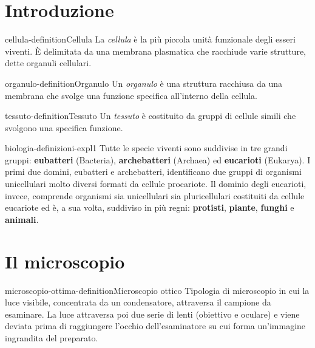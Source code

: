 \documentclass[preview]{standalone}
\begin{document}
\genpage

\section{Introduzione}

\begin{snippetdefinition}{cellula-definition}{Cellula}
    La \textit{cellula} è la più piccola unità funzionale degli esseri
    viventi. È delimitata da una membrana plasmatica
    che racchiude varie strutture, dette organuli cellulari.
\end{snippetdefinition}

\begin{snippetdefinition}{organulo-definition}{Organulo}
    Un \textit{organulo} è una struttura racchiusa da una membrana che svolge
    una funzione specifica all'interno della cellula.
\end{snippetdefinition}

\begin{snippetdefinition}{tessuto-definition}{Tessuto}
    Un \textit{tessuto} è costituito da gruppi
    di cellule simili che svolgono
    una specifica funzione.
\end{snippetdefinition}

\begin{snippet}{biologia-definizioni-expl1}
Tutte le specie viventi sono suddivise in tre grandi gruppi:
\textbf{eubatteri} (Bacteria), \textbf{archebatteri} (Archaea)
ed \textbf{eucarioti} (Eukarya).
I primi due domini, eubatteri e archebatteri, identificano due gruppi di organismi
unicellulari molto diversi formati da cellule
procariote.
Il dominio degli eucarioti, invece, comprende organismi sia unicellulari
sia pluricellulari costituiti da cellule eucariote ed è,
a sua volta, suddiviso in più regni: \textbf{protisti},
\textbf{piante}, \textbf{funghi} e \textbf{animali}.
\end{snippet}

\section{Il microscopio}

\begin{snippetdefinition}{microscopio-ottima-definition}{Microscopio ottico}
    Tipologia di microscopio in cui la luce visibile, concentrata da un condensatore, attraversa
    il campione da esaminare. La luce attraversa poi due serie di lenti (obiettivo e oculare) e
    viene deviata prima di raggiungere l'occhio dell'esaminatore su cui forma un'immagine
    ingrandita del preparato.
\end{snippetdefinition}
\end{document}
